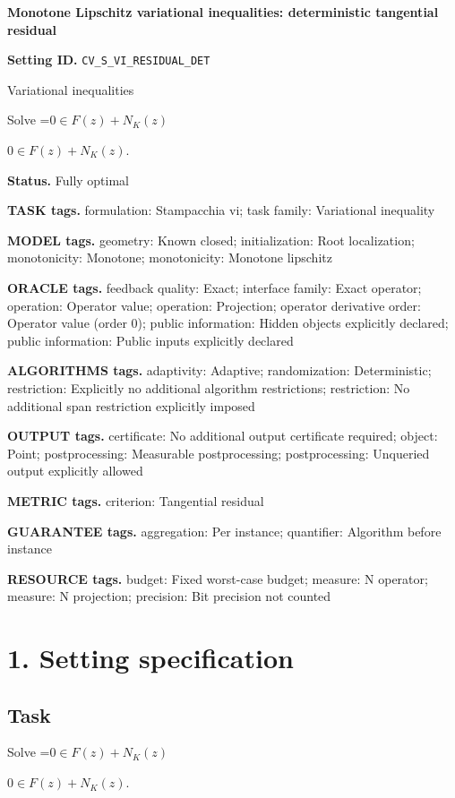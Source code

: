 \documentclass[10pt,a4paper]{article}
\newcommand{\AtlasMath}[1]{\par\begingroup\centering\setbox0=\hbox{$\displaystyle #1$}\ifdim\wd0>1.4\linewidth\typeout{ATLAS WIDE FORMULA: \the\wd0}\fi\ifdim\wd0>\linewidth\resizebox{\linewidth}{!}{\box0}\else\box0\fi\par\endgroup}
\newcommand{\AtlasInlineMath}[1]{\begingroup\setbox0=\hbox{$#1$}\ifdim\wd0>.4\linewidth\endgroup\AtlasMath{#1}\else\endgroup$#1$\fi}
\begin{document}
\raggedright

{\LARGE\bfseries\sffamily\color{AtlasNavy} Monotone Lipschitz variational inequalities: deterministic tangential residual\par}\vspace{5pt}
\textbf{Setting ID.} \texttt{CV\_\allowbreak{}S\_\allowbreak{}VI\_\allowbreak{}RESIDUAL\_\allowbreak{}DET}

Variational inequalities

Solve \AtlasInlineMath{0\in F(z)+N_K(z)}.

\textbf{Status.} Fully optimal

\textbf{TASK tags.} formulation: Stampacchia vi; task family: Variational inequality

\textbf{MODEL tags.} geometry: Known closed; initialization: Root localization; monotonicity: Monotone; monotonicity: Monotone lipschitz

\textbf{ORACLE tags.} feedback quality: Exact; interface family: Exact operator; operation: Operator value; operation: Projection; operator derivative order: Operator value (order 0); public information: Hidden objects explicitly declared; public information: Public inputs explicitly declared

\textbf{ALGORITHMS tags.} adaptivity: Adaptive; randomization: Deterministic; restriction: Explicitly no additional algorithm restrictions; restriction: No additional span restriction explicitly imposed

\textbf{OUTPUT tags.} certificate: No additional output certificate required; object: Point; postprocessing: Measurable postprocessing; postprocessing: Unqueried output explicitly allowed

\textbf{METRIC tags.} criterion: Tangential residual

\textbf{GUARANTEE tags.} aggregation: Per instance; quantifier: Algorithm before instance

\textbf{RESOURCE tags.} budget: Fixed worst-case budget; measure: N operator; measure: N projection; precision: Bit precision not counted

\section{1. Setting specification}
\subsection{Task}
Solve \AtlasInlineMath{0\in F(z)+N_K(z)}.
\end{document}
